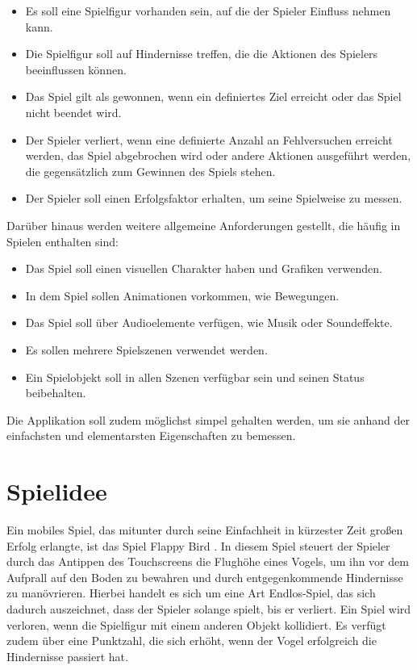 \begin{itemize}
	\item Es soll eine Spielfigur vorhanden sein, auf die der Spieler Einfluss nehmen kann.
	\item Die Spielfigur soll auf Hindernisse treffen, die die Aktionen des Spielers beeinflussen können.
	\item Das Spiel gilt als gewonnen, wenn ein definiertes Ziel erreicht oder das Spiel nicht beendet wird.
	\item Der Spieler verliert, wenn eine definierte Anzahl an Fehlversuchen erreicht werden, das Spiel abgebrochen wird oder andere Aktionen ausgeführt werden, die gegensätzlich zum Gewinnen des Spiels stehen.
	\item Der Spieler soll einen Erfolgsfaktor erhalten, um seine Spielweise zu messen.
\end{itemize}

Darüber hinaus werden weitere allgemeine Anforderungen gestellt, die häufig in Spielen enthalten sind:

\begin{itemize}
	\item Das Spiel soll einen visuellen Charakter haben und Grafiken verwenden.
	\item In dem Spiel sollen Animationen vorkommen, wie Bewegungen. 
	\item Das Spiel soll über Audioelemente verfügen, wie Musik oder Soundeffekte.
	\item Es sollen mehrere Spielszenen verwendet werden.
	\item Ein Spielobjekt soll in allen Szenen verfügbar sein und seinen Status beibehalten.
\end{itemize}

Die Applikation soll zudem möglichst simpel gehalten werden, um sie anhand der einfachsten und elementarsten Eigenschaften zu bemessen.


\section{Spielidee}
Ein mobiles Spiel, das mitunter durch seine Einfachheit in kürzester Zeit großen Erfolg erlangte, ist das Spiel Flappy Bird \citep{flappy_bird}.
In diesem Spiel steuert der Spieler durch das Antippen des Touchscreens die Flughöhe eines Vogels, um ihn vor dem Aufprall auf den Boden zu bewahren und durch entgegenkommende Hindernisse zu manövrieren. Hierbei handelt es sich um eine Art Endlos-Spiel, das sich dadurch auszeichnet, dass der Spieler solange spielt, bis er verliert. Ein Spiel wird verloren, wenn die Spielfigur mit einem anderen Objekt kollidiert. Es verfügt zudem über eine Punktzahl, die sich erhöht, wenn der Vogel erfolgreich die Hindernisse passiert hat.

